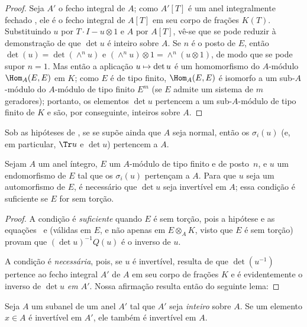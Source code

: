 \documentclass[oneside,10pt]{amsart}
\makeatletter
\newcommand{\ega@arrow}[2]{\mathchoice{#1}{#2}{#2}{#2}}
\let\ega@shortmapsto\mapsto
\renewcommand{\mapsto}{\ega@arrow{\longmapsto}{\ega@shortmapsto}}
\newcommand{\oldpage}[2][]{\marginnote{\normalfont\footnotesize\textbf{#1}~|~#2}\ignorespaces}
\let\EGAOriginalLabel\label
\renewcommand{\label}[1]{\phantomsection\EGAOriginalLabel{#1}}
\makeatother
\begin{document}
\begin{proof}
Seja $A'$ o fecho integral de $A$;
como $A'[T]$ é um anel integralmente fechado \cite[p.~99]{II-24}, ele é o fecho integral de $A[T]$ em seu corpo de frações $K(T)$.
Substituindo $u$ por $T\cdot I-u\otimes1$ e $A$ por $A[T]$, vê-se que se pode reduzir à demonstração de que $\det u$ é inteiro sobre $A$.
Se $n$ é o posto de $E$, então $\det(u)=\det(\wedge^n u)$ e $(\wedge^n u)\otimes1=\wedge^n(u\otimes1)$, de modo que se pode supor $n=1$.
Mas então a aplicação $u\mapsto\det u$ é um homomorfismo do $A$-módulo $\Hom_A(E,E)$ em $K$;
como $E$ é de tipo finito, $\Hom_A(E,E)$ é isomorfo a um sub-$A$-módulo do $A$-módulo de tipo finito $E^m$ (se $E$ admite um sistema de $m$ geradores); portanto, os elementos $\det u$ pertencem a um sub-$A$-módulo de tipo finito de $K$ e são, por conseguinte, inteiros sobre $A$.
\end{proof}
\oldpage[II]{122}
\begin{corollary}[6.4.4]
\label{II.6.4.4}
Sob as hipóteses de , se se supõe ainda que $A$ seja normal, então os $\sigma_i(u)$ (e, em particular, $\Tr u$ e $\det u$) pertencem a $A$.
\end{corollary}

\begin{proposition}[6.4.5]
\label{II.6.4.5}
Sejam $A$ um anel íntegro, $E$ um $A$-módulo de tipo finito e de posto~$n$, e $u$ um endomorfismo de $E$ tal que os $\sigma_i(u)$ pertençam a $A$.
Para que $u$ seja um automorfismo de $E$, é necessário que $\det u$ seja invertível em $A$;
essa condição é suficiente se $E$ for sem torção.
\end{proposition}

\begin{proof}
A condição é \emph{suficiente} quando $E$ é sem torção, pois a hipótese e as equações~ e  (válidas em $E$, e não apenas em $E\otimes_A K$, visto que $E$ é sem torção) provam que $(\det u)^{-1}Q(u)$ é o inverso de $u$.

A condição é \emph{necessária}, pois, se $u$ é invertível, resulta de  que $\det(u^{-1})$ pertence ao fecho integral $A'$ de $A$ em seu corpo de frações $K$ e é evidentemente o inverso de $\det u$ \emph{em $A'$}.
Nossa afirmação resulta então do seguinte lema:
\end{proof}

\begin{lemma}[6.4.5.1]
\label{II.6.4.5.1}
Seja $A$ um subanel de um anel $A'$ tal que $A'$ seja \emph{inteiro} sobre $A$.
Se um elemento $x\in A$ é invertível em $A'$, ele também é invertível em $A$.
\end{lemma}
\end{document}
